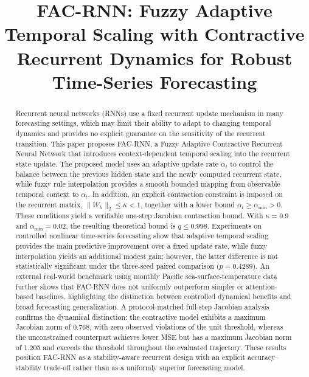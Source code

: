 \documentclass[journal]{IEEEtran}
\begin{document}
	
	
	\title{FAC-RNN: Fuzzy Adaptive Temporal Scaling with Contractive Recurrent Dynamics for Robust Time-Series Forecasting}
	
	
	\maketitle
	
	
	\begin{abstract}
Recurrent neural networks (RNNs) use a fixed recurrent update mechanism in many forecasting settings, which may limit their ability to adapt to changing temporal dynamics and provides no explicit guarantee on the sensitivity of the recurrent transition. This paper proposes FAC-RNN, a Fuzzy Adaptive Contractive Recurrent Neural Network that introduces context-dependent temporal scaling into the recurrent state update. The proposed model uses an adaptive update rate $\alpha_t$ to control the balance between the previous hidden state and the newly computed recurrent state, while fuzzy rule interpolation provides a smooth bounded mapping from observable temporal context to $\alpha_t$. In addition, an explicit contraction constraint is imposed on the recurrent matrix, $\lVert W_h\rVert_2\leq\kappa<1$, together with a lower bound $\alpha_t\geq\alpha_{\min}>0$. These conditions yield a verifiable one-step Jacobian contraction bound. With $\kappa=0.9$ and $\alpha_{\min}=0.02$, the resulting theoretical bound is $q\leq0.998$. Experiments on controlled nonlinear time-series forecasting show that adaptive temporal scaling provides the main predictive improvement over a fixed update rate, while fuzzy interpolation yields an additional modest gain; however, the latter difference is not statistically significant under the three-seed paired comparison ($p=0.4289$). An external real-world benchmark using monthly Pacific sea-surface-temperature data further shows that FAC-RNN does not uniformly outperform simpler or attention-based baselines, highlighting the distinction between controlled dynamical benefits and broad forecasting generalization. A protocol-matched full-step Jacobian analysis confirms the dynamical distinction: the contractive model exhibits a maximum Jacobian norm of 0.768, with zero observed violations of the unit threshold, whereas the unconstrained counterpart achieves lower MSE but has a maximum Jacobian norm of 1.205 and exceeds the threshold throughout the evaluated trajectory. These results position FAC-RNN as a stability-aware recurrent design with an explicit accuracy--stability trade-off rather than as a uniformly superior forecasting model.
\end{abstract}
	
\end{document}
